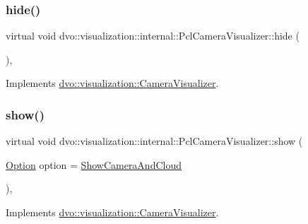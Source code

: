 \subsubsection{\texorpdfstring{hide()}{hide()}}
{\footnotesize\ttfamily virtual void dvo\+::visualization\+::internal\+::\+Pcl\+Camera\+Visualizer\+::hide (\begin{DoxyParamCaption}{ }\end{DoxyParamCaption})\hspace{0.3cm}{\ttfamily [inline]}, {\ttfamily [virtual]}}



Implements \mbox{\hyperlink{classdvo_1_1visualization_1_1_camera_visualizer_a45dbf0d449a7b7529f7da477c676ca85}{dvo\+::visualization\+::\+Camera\+Visualizer}}.

\mbox{\label{classdvo_1_1visualization_1_1internal_1_1_pcl_camera_visualizer_a09b5d8117f8ca15489ac42f6b6019030}} 
\subsubsection{\texorpdfstring{show()}{show()}}
{\footnotesize\ttfamily virtual void dvo\+::visualization\+::internal\+::\+Pcl\+Camera\+Visualizer\+::show (\begin{DoxyParamCaption}\item[{\mbox{\hyperlink{classdvo_1_1visualization_1_1_camera_visualizer_a0526f50be9f298c4f7d1f91018d50af7}{Option}}}]{option = {\ttfamily \mbox{\hyperlink{classdvo_1_1visualization_1_1_camera_visualizer_a0526f50be9f298c4f7d1f91018d50af7a0ff8fc7d7283f27066e93ca0d4ef3f19}{Show\+Camera\+And\+Cloud}}} }\end{DoxyParamCaption})\hspace{0.3cm}{\ttfamily [inline]}, {\ttfamily [virtual]}}



Implements \mbox{\hyperlink{classdvo_1_1visualization_1_1_camera_visualizer_a646b21ea800d07f6a4174c80daf2bf50}{dvo\+::visualization\+::\+Camera\+Visualizer}}.

\mbox{\label{classdvo_1_1visualization_1_1internal_1_1_pcl_camera_visualizer_adfe2b8752f78ee0fa6ee193be70941eb}} 
